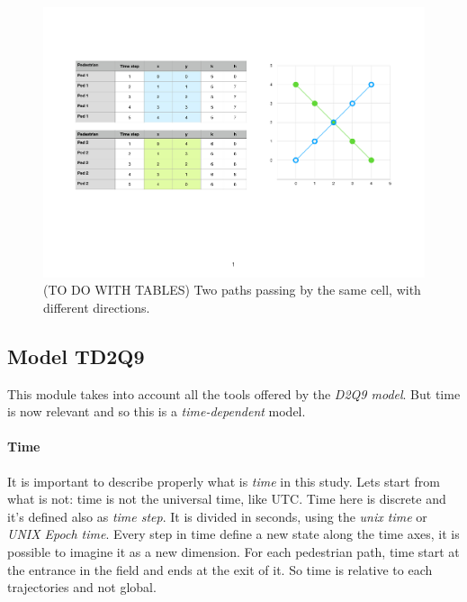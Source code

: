 \documentclass[class=article, crop=false]{standalone}
\begin{document}
\begin{figure}[h]
\centering
\includegraphics[scale=0.5]{draw/eg_distribution_two_trajectories_2}
\captionsetup{width=.7\linewidth}
\caption{(TO DO WITH TABLES) Two paths passing by the same cell, with different directions.}
\label{fig:two_trj_same_cell}
\end{figure}

\subsection{Model TD2Q9}
This module takes into account all the tools offered by the \emph{D2Q9 model}.
But time is now relevant and so this is a \emph{time-dependent} model.
\paragraph{Time}
It is important to describe properly what is \emph{time} in this study.
Lets start from what is not: time is not the universal time, like UTC.
Time here is discrete and it's defined also as \emph{time step}.
It is divided in seconds, using the \emph{unix time} or \emph{UNIX Epoch time}.
Every step in time define a new state along the time axes, it is possible to imagine it as a new dimension.
For each pedestrian path, time start at the entrance in the field and ends at the exit of it.
So time is relative to each trajectories and not global.
\end{document}
